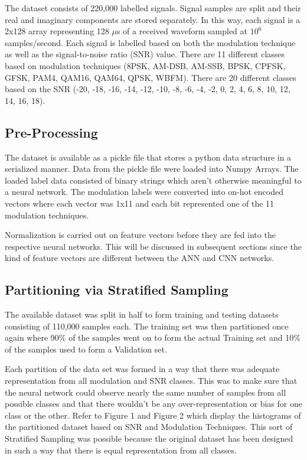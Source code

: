 \documentclass[journal,onecolumn]{IEEEtran}
\begin{document}
The dataset consists of 220,000 labelled signals. Signal samples are split and their real and imaginary components are stored separately. In this way, each signal is a 2x128 array representing 128 $\mu$s of a received waveform sampled at $10^{6}$ samples/second. Each signal is labelled based on both the modulation technique as well as the signal-to-noise ratio (SNR) value. There are 11 different classes based on modulation techniques  (8PSK, AM-DSB, AM-SSB, BPSK, CPFSK, GFSK, PAM4, QAM16, QAM64, QPSK, WBFM). There are 20 different classes based on the SNR (-20, -18, -16, -14, -12, -10, -8, -6, -4, -2, 0, 2, 4, 6, 8, 10, 12, 14, 16, 18).

\subsection{Pre-Processing}

The dataset is available as a pickle file that stores a python data structure in a serialized manner. Data from the pickle file were loaded into Numpy Arrays. The loaded label data consisted of binary strings which aren't otherwise meaningful to a neural network. The modulation labels were converted into on-hot encoded vectors where each vector was 1x11 and each bit represented one of the 11 modulation techniques.

Normalization is carried out on feature vectors before they are fed into the respective neural networks. This will be discussed in subsequent sections since the kind of feature vectors are different between the ANN and CNN networks.

\subsection{Partitioning via Stratified Sampling}

The available dataset was split in half to form training and testing datasets consisting of 110,000 samples each. The training set was then partitioned once again where 90\% of the samples went on to form the actual Training set and 10\% of the samples used to form a Validation set.

Each partition of the data set was formed in a way that there was adequate representation from all modulation and SNR classes. This was to make sure that the neural network could observe nearly the same number of samples from all possible classes and that there wouldn't be any over-representation or bias for one class or the other. Refer to Figure 1 and Figure 2 which display the histograms of the partitioned dataset based on SNR and Modulation Techniques. This sort of Stratified Sampling \cite{stratSamp} was possible because the original dataset has been designed in such a way that there is equal representation from all classes.
\end{document}
